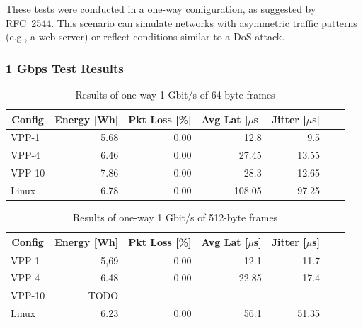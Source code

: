 These tests were conducted in a one-way configuration, as suggested by RFC~2544\cite{rfc2544}.
This scenario can simulate networks with asymmetric traffic patterns (e.g., a web server) or reflect conditions similar to a DoS attack.

\subsubsection{1 Gbps Test Results}

\begin{table}[h!]
\centering
\caption{Results of one-way 1 Gbit/s of 64-byte frames}
\begin{tabular}{|l|r|r|r|r|r|r|}
\hline
\multicolumn{1}{|c|}{\textbf{Config}} &
\multicolumn{1}{c|}{\textbf{Energy [Wh] }} &
\multicolumn{1}{c|}{\textbf{Pkt Loss [\%]}} &
\multicolumn{1}{c|}{\textbf{Avg Lat [$\mu$s]}} &
\multicolumn{1}{c|}{\textbf{Jitter [$\mu$s]}} \\
\hline 
VPP-1 & 5.68 & 0.00 & 12.8 & 9.5 \\
VPP-4 & 6.46 & 0.00 & 27.45 & 13.55 \\
VPP-10 & 7.86 & 0.00 & 28.3 & 12.65 \\
Linux & 6.78 & 0.00 & 108.05 & 97.25 \\
\hline
\end{tabular}
\label{tab:1udp:64B}
\end{table}


\begin{table}[h!]
\centering
\caption{Results of one-way 1 Gbit/s of 512-byte frames}
\begin{tabular}{|l|r|r|r|r|r|r|}
\hline
\multicolumn{1}{|c|}{\textbf{Config}} &
\multicolumn{1}{c|}{\textbf{Energy [Wh] }} &
\multicolumn{1}{c|}{\textbf{Pkt Loss [\%]}} &
\multicolumn{1}{c|}{\textbf{Avg Lat [$\mu$s]}} &
\multicolumn{1}{c|}{\textbf{Jitter [$\mu$s]}} \\
\hline 
VPP-1 & 5,69 & 0.00 & 12.1 & 11.7 \\
VPP-4 & 6.48 & 0.00 & 22.85 & 17.4 \\
VPP-10 & TODO &  &  &  \\
Linux & 6.23 & 0.00 & 56.1 & 51.35 \\
\hline
\end{tabular}
\label{tab:1udp:512B}
\end{table}


